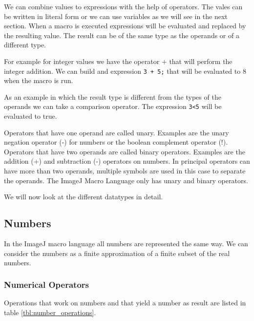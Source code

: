 We can combine values to expressions with the help of operators. The vales can be written in literal form or we can use variables as we will see in the next section. When a macro is executed expressions will be evaluated and replaced by the resulting value. The result can be of the same type as the operands or of a different type.

For example for integer values we have the operator + that will perform the integer addition. We can build and expression {\tt 3 + 5;} that will be evaluated to 8 when the macro is run.

As an example in which the result type is different from the types of the operands we can take a comparison operator. The expression {\tt 3<5} will be evaluated to true.

Operators that have one operand are called unary. Examples are the unary negation operator (-) for numbers or the boolean complement operator (!). Operators that have two operands are called binary operators. Examples are the addition (+) and subtraction (-) operators on numbers. In principal operators can have more than two operands, multiple symbols are used in this case to separate the operands. The ImageJ Macro Language only has unary and binary operators.

We will now look at the different datatypes in detail. 


\subsection{Numbers}

In the ImageJ macro language all numbers are represented the same way. We can consider the numbers as a finite approximation of a finite subset of the real numbers.

\subsubsection{Numerical Operators}

 Operations that work on numbers and that yield a number as result are listed in table \ref{tbl:number_operations}.

